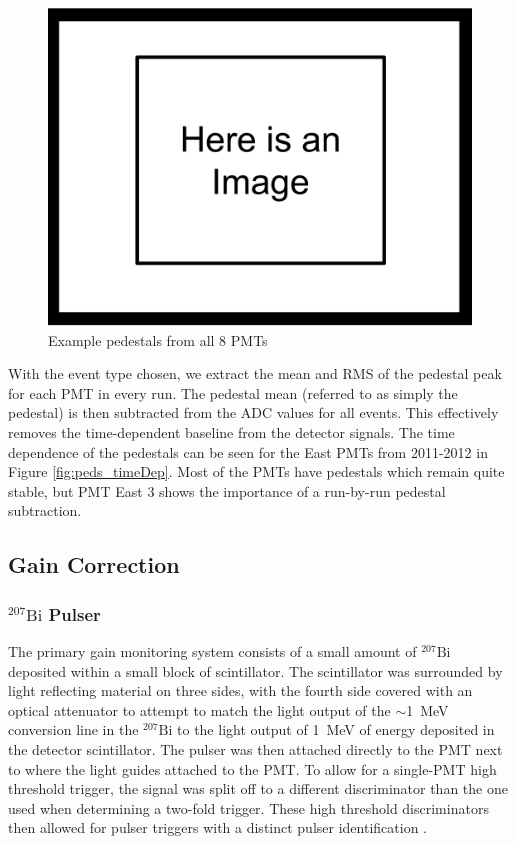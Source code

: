 \begin{figure}[h] 
\centering
\includegraphics[scale=.25]{3-UCNAAnalysis/ImageHolder.pdf}
\caption{Example pedestals from all 8 PMTs}
\label{fig:peds_ind}
\end{figure}
\fi



With the event type chosen, we extract the mean and RMS of the pedestal peak
for each PMT in every run. The pedestal mean (referred to as simply
the pedestal) is then subtracted from the ADC values for all events. This effectively
removes the time-dependent baseline from the detector signals. The time dependence of
the pedestals can be seen for the East PMTs from 2011-2012 in Figure \ref{fig:peds_timeDep}.
Most of the PMTs have pedestals which remain quite stable, but PMT East 3 shows the
importance of a run-by-run pedestal subtraction.



\subsection{Gain Correction} \label{ssec:BiGain}

\subsubsection{$^{207}\mathrm{Bi}$ Pulser}
The primary gain monitoring system consists of a small amount of $^{207}\mathrm{Bi}$
deposited within a small block of scintillator. The scintillator was surrounded by
light reflecting material on three sides, with the fourth side covered with an optical
attenuator to attempt to match the light output of the $\sim$1~MeV conversion line in the $^{207}\mathrm{Bi}$
to the light output of 1~MeV of energy deposited in the detector scintillator. The pulser was then
attached directly to the PMT next to where the light guides attached to the PMT.
To allow for a single-PMT high threshold trigger, the signal was split off to a different
discriminator than the one used when determining a two-fold trigger. These high threshold
discriminators then allowed for pulser triggers with a distinct pulser identification \cite{mpmThesis}.

